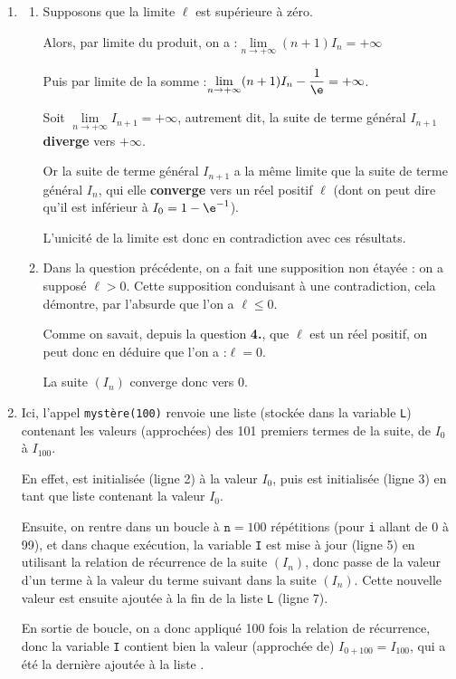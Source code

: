 \begin{enumerate}
On arrive bien à la relation de récurrence annoncée.

\item 
	\begin{enumerate}
		\item Supposons que la limite $\ell$ est supérieure à zéro.

Alors, par limite du produit, on a :\quad $\lim\limits_{n \to +\infty} (n+1)I_n = +\infty$

		Puis par limite de la somme :\quad $\lim\limits_{n \to +\infty} (n+1)I_n - \dfrac{1}{\e}= +\infty$.

Soit \quad $\lim\limits_{n \to +\infty} I_{n + 1} =+\infty$, \quad autrement dit, la suite de terme général $I_{n+1}$ \textbf{diverge} vers $+\infty$.

Or la suite de terme général $I_{n+1}$ a la même limite que la suite de terme général $I_n$, qui elle \textbf{converge} vers un réel positif $\ell$ (dont on peut dire qu'il est inférieur à $I_0 = 1 - \e^{-1}$).

L'unicité de la limite est donc en contradiction avec ces résultats.

		\item Dans la question précédente, on a fait une supposition non étayée : on a supposé $\ell > 0$. Cette supposition conduisant à une contradiction, cela démontre, par l'absurde que l'on a $\ell \leqslant 0$.

Comme on savait, depuis la question \textbf{4.}, que $\ell$ est un réel positif, on peut donc en déduire que l'on a :\quad$\ell = 0$.

La suite $(I_n)$ converge donc vers 0.
	\end{enumerate}
	\item Ici, l'appel \texttt{mystère(100)} renvoie une liste (stockée dans la variable \texttt{L}) contenant les valeurs (approchées) des 101 premiers termes de la suite, de $I_0$ à $I_{100}$.

En effet,  est initialisée (ligne 2) à la valeur $I_0$, puis  est initialisée (ligne 3) en tant que liste contenant la valeur $I_0$.

Ensuite, on rentre dans un boucle à $\texttt{n} = 100$ répétitions (pour \texttt{i} allant de 0 à 99), et dans chaque exécution, la variable \texttt{I} est mise à jour (ligne 5) en utilisant la relation de récurrence de la suite $(I_n)$, donc passe de la valeur d'un terme à la valeur du terme suivant dans la suite $(I_n)$. Cette nouvelle valeur est ensuite ajoutée à la fin de la liste \texttt{L} (ligne 7).

En sortie de boucle, on a donc appliqué 100 fois la relation de récurrence, donc la variable \texttt{I} contient bien la valeur (approchée de) $I_{0 + 100} = I_{100}$, qui a été la dernière ajoutée à la liste .
\end{enumerate}
\medskip
